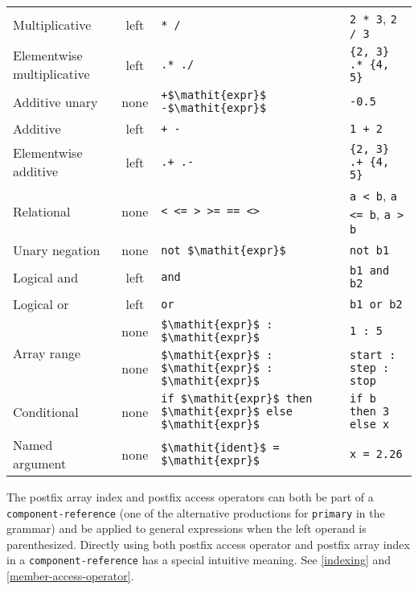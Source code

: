 \begin{table}[H]
\begin{center}
\begin{tabular}{l c l l}
\hline
Multiplicative & left & {\lstinline!* /!} & {\lstinline!2 * 3!}, {\lstinline!2 / 3!}\\
Elementwise multiplicative & left & {\lstinline!.* ./!} & {\lstinline!{2, 3} .* {4, 5}!}\\
\hline
Additive unary & none & {\lstinline!+$\mathit{expr}$ -$\mathit{expr}$!} & {\lstinline!-0.5!}\\
\hline
Additive & left & {\lstinline!+ -!} & {\lstinline!1 + 2!}\\
Elementwise additive & left & {\lstinline!.+ .-!} & {\lstinline!{2, 3} .+ {4, 5}!}\\
\hline
Relational & none & {\lstinline!< <= > >= == <>!} & {\lstinline!a < b!}, {\lstinline!a <= b!}, {\lstinline!a > b!}\\
\hline
Unary negation & none & {\lstinline!not $\mathit{expr}$!} & {\lstinline!not b1!}\\
\hline
Logical and & left & {\lstinline!and!} & {\lstinline!b1 and b2!}\\
\hline
Logical or & left & {\lstinline!or!} & {\lstinline!b1 or b2!}\\
\hline
\multirow{2}{*}{Array range} & none & {\lstinline!$\mathit{expr}$ : $\mathit{expr}$!} & {\lstinline!1 : 5!}\\
                             & none & {\lstinline!$\mathit{expr}$ : $\mathit{expr}$ : $\mathit{expr}$!} & {\lstinline!start : step : stop!}\\
\hline
Conditional & none & {\lstinline!if $\mathit{expr}$ then $\mathit{expr}$ else $\mathit{expr}$!} & {\lstinline!if b then 3 else x!}\\
\hline
Named argument & none & {\lstinline!$\mathit{ident}$ = $\mathit{expr}$!} & {\lstinline!x = 2.26!}\\
\hline
\end{tabular}
\end{center}
\end{table}

The postfix array index and postfix access operators can both be part of a \lstinline[language=grammar]!component-reference! (one of the alternative productions for \lstinline[language=grammar]!primary! in the grammar) and be applied to general expressions when the left operand is parenthesized.
Directly using both postfix access operator and postfix array index in a \lstinline[language=grammar]!component-reference! has a special intuitive meaning.
See \cref{indexing} and \cref{member-access-operator}.

